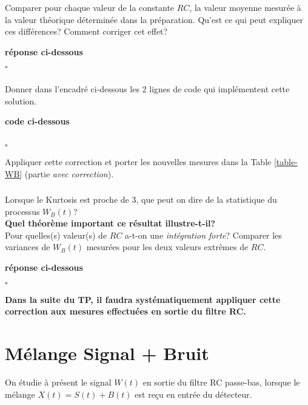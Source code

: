 \documentclass{article}
\newcommand{\debutrep}[1]{\color{blue}\begin{center} \hrulefill \textbf{ #1 } \hrulefill \end{center} }
\newcommand{\finrep}{\vspace*{5mm}\hfill $\square$\color{black}\vspace*{5mm}}
\begin{document}
\subsubsection{}

Comparer pour chaque valeur de la constante $RC$, la valeur moyenne mesurée à la valeur théorique déterminée dans la préparation. Qu'est ce qui peut expliquer ces différences? Comment corriger cet effet?  \\

\debutrep{réponse ci-dessous}

\finrep

\subsubsection{}
Donner dans l'encadré ci-dessous les 2 lignes de code qui implémentent cette solution.

\debutrep{code ci-dessous}
\begin{verbatim}

\end{verbatim}
\finrep

Appliquer cette correction et porter les nouvelles mesures dans la Table \ref{table-WB} (partie {\em avec correction}).


\subsubsection{}
Lorsque le Kurtosis est proche de $3$, que peut on dire de la statistique du processus $W_B(t)$? \\
\textbf{Quel théorème important ce résultat illustre-t-il?}\\
 Pour quelles(s) valeur(s) de $RC$ a-t-on une {\em intégration forte}?  Comparer les variances de $W_B(t)$ mesurées pour les deux valeurs extrêmes de $RC$. 

\debutrep{réponse ci-dessous}

\finrep

\textbf{Dans la suite du TP, il faudra systématiquement appliquer cette correction aux mesures effectuées en sortie du filtre RC.}

\clearpage
\section{Mélange Signal + Bruit}
\label{sec:melange}

On étudie à présent le signal $W(t)$ en sortie du filtre RC passe-bas, lorsque le mélange $X(t) = S(t) + B(t)$ est reçu en entrée du détecteur.
\end{document}

